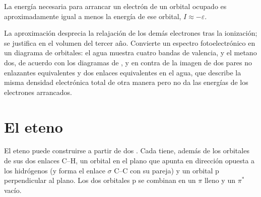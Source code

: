 \begin{proposition}\label{prop:b2:fragment-orbitals:koopmans}
La energía necesaria para arrancar un electrón de un orbital ocupado es
aproximadamente igual a menos la energía de ese orbital, $I \approx -\varepsilon$.
\end{proposition}

\admitted

La aproximación desprecia la relajación de los demás electrones tras la
ionización; se justifica en el volumen del tercer año. Convierte un espectro
fotoelectrónico en un diagrama de orbitales: el agua muestra cuatro bandas de valencia, y el metano dos,
de acuerdo con los diagramas de , y en contra de la imagen de dos pares no enlazantes
equivalentes y dos enlaces equivalentes en el agua, que describe la misma densidad electrónica
total de otra manera pero no da las energías de los
electrones arrancados.

\section{El eteno}

El eteno puede construirse a partir de dos  . Cada  tiene, además de los
orbitales de sus dos enlaces C--H, un orbital en el plano que apunta en dirección opuesta a los hidrógenos
(y forma el enlace $\sigma$ C--C con su pareja) y un orbital p
perpendicular al plano. Los dos orbitales p se combinan en un $\pi$ lleno y un
$\pi^*$ vacío.

